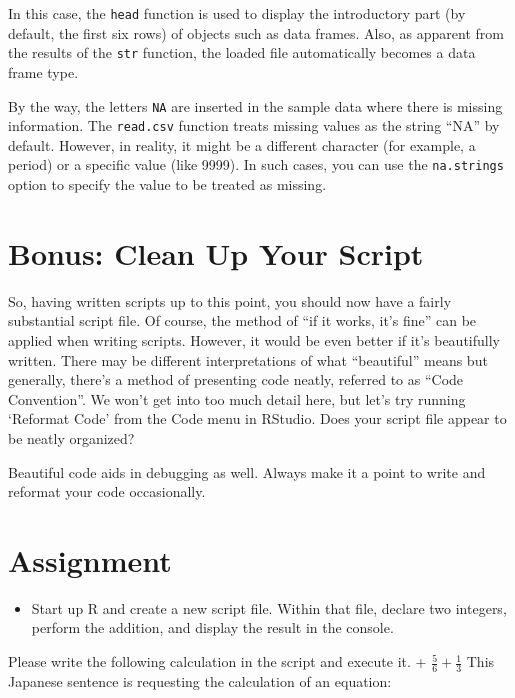 \documentclass[
  a4paper,
]{book}
\providecommand{\tightlist}{%
  \setlength{\itemsep}{0pt}\setlength{\parskip}{0pt}}\usepackage{longtable,booktabs,array}
\begin{document}
In this case, the \texttt{head} function is used to display the
introductory part (by default, the first six rows) of objects such as
data frames. Also, as apparent from the results of the \texttt{str}
function, the loaded file automatically becomes a data frame type.

By the way, the letters \texttt{NA} are inserted in the sample data
where there is missing information. The \texttt{read.csv} function
treats missing values as the string ``NA'' by default. However, in
reality, it might be a different character (for example, a period) or a
specific value (like 9999). In such cases, you can use the
\texttt{na.strings} option to specify the value to be treated as
missing.

\section{Bonus: Clean Up Your Script}\label{bonus-clean-up-your-script}

So, having written scripts up to this point, you should now have a
fairly substantial script file. Of course, the method of ``if it works,
it's fine'' can be applied when writing scripts. However, it would be
even better if it's beautifully written. There may be different
interpretations of what ``beautiful'' means but generally, there's a
method of presenting code neatly, referred to as ``Code Convention''. We
won't get into too much detail here, but let's try running `Reformat
Code' from the Code menu in RStudio. Does your script file appear to be
neatly organized?

Beautiful code aids in debugging as well. Always make it a point to
write and reformat your code occasionally.

\section{Assignment}\label{assignment-1}

\begin{itemize}
\tightlist
\item
  Start up R and create a new script file. Within that file, declare two
  integers, perform the addition, and display the result in the console.
\end{itemize}

Please write the following calculation in the script and execute it. +
\(\frac{5}{6} + \frac{1}{3}\) This Japanese sentence is requesting the
calculation of an equation:
\end{document}
